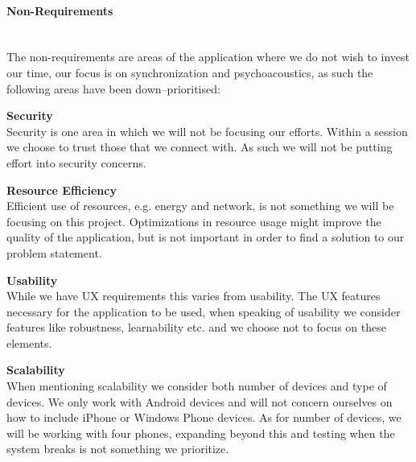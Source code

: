 \paragraph{Non-Requirements} \hfill\\
The non-requirements are areas of the application where we do not wish to invest our time, our focus is on synchronization and psychoacoustics, as such the following areas have been down--prioritised:
\begin{eletterate}[resume]
    \item \textbf{Security} \hfill\\
    Security is one area in which we will not be focusing our efforts.
    Within a session we choose to trust those that we connect with. 
    As such we will not be putting effort into security concerns.
    \item \textbf{Resource Efficiency} \hfill\\
    Efficient use of resources, e.g. energy and network, is not something we will be focusing on this project.
    Optimizations in resource usage might improve the quality of the application, but is not important in order to find a solution to our problem statement.
    \item \textbf{Usability} \hfill\\
    While we have \ac{UX} requirements this varies from usability.
    The \ac{UX} features necessary for the application to be used, when speaking of usability we consider features like robustness, learnability etc. and we choose not to focus on these elements.
    \item \textbf{Scalability} \hfill\\
    When mentioning scalability we consider both number of devices and type of devices.
    We only work with Android devices and will not concern ourselves on how to include iPhone or Windows Phone devices.
    As for number of devices, we will be working with four phones, expanding beyond this and testing when the system breaks is not something we prioritize.
\end{eletterate}
